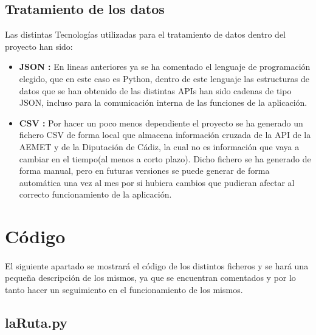 \documentclass[a4paper,11pt]{article}
\begin{document}
    \subsection{Tratamiento de los datos}
    Las distintas Tecnologías utilizadas para el tratamiento de datos dentro del proyecto han sido:
    \begin{itemize}
        \item \textbf{JSON :} En lineas anteriores ya se ha comentado el lenguaje de programación elegido, que en este caso es Python, dentro de este lenguaje las estructuras de datos que se han obtenido de las distintas APIs han sido cadenas de tipo JSON, incluso para la comunicación interna de las funciones de la aplicación.
        \item \textbf{CSV :} Por hacer un poco menos dependiente el proyecto se ha generado un fichero CSV de forma local que almacena información cruzada de la API de la AEMET y de la Diputación de Cádiz, la cual no es información que vaya a cambiar en el tiempo(al menos a corto plazo). Dicho fichero se ha generado de forma manual, pero en futuras versiones se puede generar de forma automática una vez al mes por si hubiera cambios que pudieran afectar al correcto funcionamiento de la aplicación.
    \end{itemize}
    \section{Código}
    \paragraph{}
    El siguiente apartado se mostrará el código de los distintos ficheros y se hará una pequeña descripción de los mismos, ya que se encuentran comentados y por lo tanto hacer un seguimiento en el funcionamiento de los mismos.
    \subsection{laRuta.py}
\end{document}
